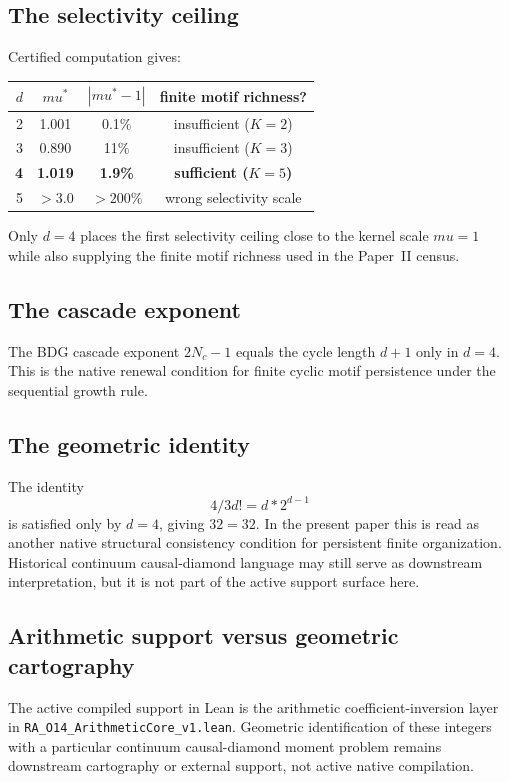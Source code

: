 \documentclass[11pt]{article}
\def\mu{mu}%
\def\frac#1#2{#1/#2}%
\def\cdot{*}%
\begin{document}
\subsection{The selectivity ceiling}

Certified computation gives:
\begin{center}
\begin{tabular}{rccc}
\toprule
$d$ & $\mu^*$ & $|\mu^*-1|$ & finite motif richness? \\
\midrule
2 & 1.001 & 0.1\% & insufficient ($K=2$) \\
3 & 0.890 & 11\% & insufficient ($K=3$) \\
\textbf{4} & \textbf{1.019} & \textbf{1.9\%} & \textbf{sufficient ($K=5$)} \\
5 & $>3.0$ & $>200\%$ & wrong selectivity scale \\
\bottomrule
\end{tabular}
\end{center}

Only $d=4$ places the first selectivity ceiling close to the kernel scale $\mu=1$ while also supplying the finite motif richness used in the Paper~II census.

\subsection{The cascade exponent}

The BDG cascade exponent $2N_c-1$ equals the cycle length $d+1$ only in $d=4$. This is the native renewal condition for finite cyclic motif persistence under the sequential growth rule.

\subsection{The geometric identity}

The identity
\[
\frac{4}{3}d! = d\cdot 2^{d-1}
\]
is satisfied only by $d=4$, giving $32=32$. In the present paper this is read as another native structural consistency condition for persistent finite organization. Historical continuum causal-diamond language may still serve as downstream interpretation, but it is not part of the active support surface here.

\subsection{Arithmetic support versus geometric cartography}

The active compiled support in Lean is the arithmetic coefficient-inversion layer in \texttt{RA\_O14\_ArithmeticCore\_v1.lean}. Geometric identification of these integers with a particular continuum causal-diamond moment problem remains downstream cartography or external support, not active native compilation.
\end{document}
